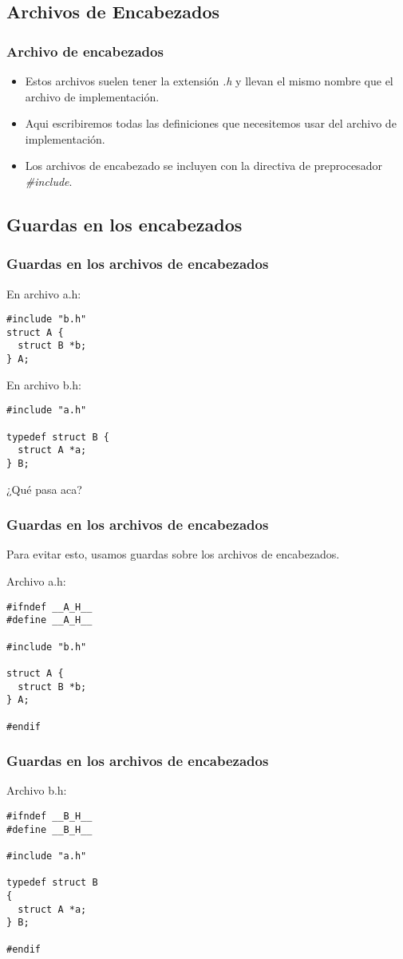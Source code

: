 \documentclass{beamer}
\begin{document}
\subsection{Archivos de Encabezados}
\begin{frame}
\frametitle{Archivo de encabezados}
\begin{itemize}
 \item Estos archivos suelen tener la extensión \emph{.h} y llevan el mismo nombre que el archivo de implementación.
 \item Aqui escribiremos todas las definiciones que necesitemos usar del archivo de implementación.
 \item Los archivos de encabezado se incluyen con la directiva de preprocesador \emph{\#include}.
\end{itemize}

\end{frame}

\subsection{Guardas en los encabezados}
\begin{frame}[fragile]
\frametitle{Guardas en los archivos de encabezados}
En archivo a.h:
\begin{verbatim}
#include "b.h"
struct A {
  struct B *b;
} A;
\end{verbatim}

En archivo b.h:
\begin{verbatim}
#include "a.h"

typedef struct B {
  struct A *a;
} B;
\end{verbatim}

¿Qué pasa aca?
\end{frame}

\begin{frame}[fragile]
\frametitle{Guardas en los archivos de encabezados}
Para evitar esto, usamos guardas sobre los archivos de encabezados.

Archivo a.h:
\begin{verbatim}
#ifndef __A_H__
#define __A_H__

#include "b.h"

struct A {
  struct B *b;
} A;

#endif
\end{verbatim}
\end{frame}

\begin{frame}[fragile]
\frametitle{Guardas en los archivos de encabezados}

Archivo b.h:
\begin{verbatim}
#ifndef __B_H__
#define __B_H__

#include "a.h"

typedef struct B
{
  struct A *a;
} B;

#endif
\end{verbatim}


\end{frame}
\end{document}
